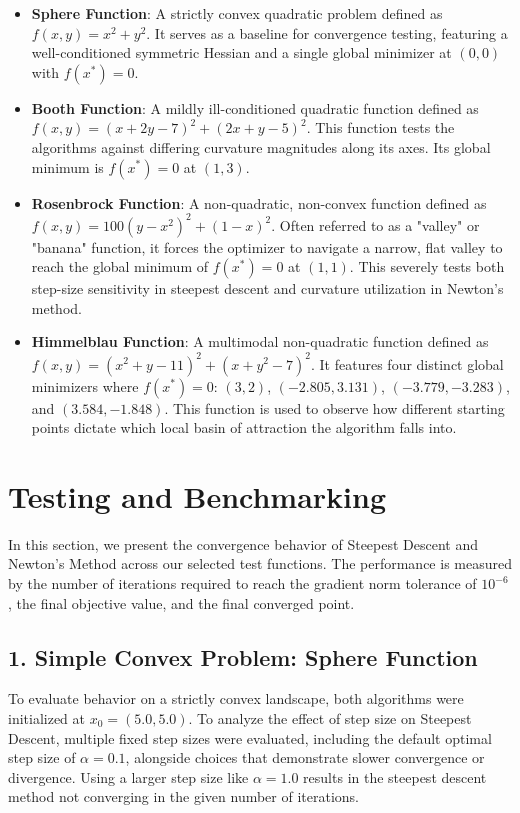 \documentclass{report}
\begin{document}
\begin{itemize}
    \item \textbf{Sphere Function}: A strictly convex quadratic problem defined as $f(x, y) = x^2 + y^2$. It serves as a baseline for convergence testing, featuring a well-conditioned symmetric Hessian and a single global minimizer at $(0, 0)$ with $f(x^*) = 0$.
    \item \textbf{Booth Function}: A mildly ill-conditioned quadratic function defined as $f(x, y) = (x + 2y - 7)^2 + (2x + y - 5)^2$. This function tests the algorithms against differing curvature magnitudes along its axes. Its global minimum is $f(x^*) = 0$ at $(1, 3)$.
    \item \textbf{Rosenbrock Function}: A non-quadratic, non-convex function defined as $f(x, y) = 100(y - x^2)^2 + (1 - x)^2$. Often referred to as a "valley" or "banana" function, it forces the optimizer to navigate a narrow, flat valley to reach the global minimum of $f(x^*) = 0$ at $(1, 1)$. This severely tests both step-size sensitivity in steepest descent and curvature utilization in Newton's method.
    \item \textbf{Himmelblau Function}: A multimodal non-quadratic function defined as $f(x, y) = (x^2 + y - 11)^2 + (x + y^2 - 7)^2$. It features four distinct global minimizers where $f(x^*) = 0$: $(3, 2)$, $(-2.805, 3.131)$, $(-3.779, -3.283)$, and $(3.584, -1.848)$. This function is used to observe how different starting points dictate which local basin of attraction the algorithm falls into.
\end{itemize}

\section*{Testing and Benchmarking}

In this section, we present the convergence behavior of Steepest Descent and Newton's Method across our selected test functions. The performance is measured by the number of iterations required to reach the gradient norm tolerance of $10^{-6}$, the final objective value, and the final converged point.

\subsection*{1. Simple Convex Problem: Sphere Function}
To evaluate behavior on a strictly convex landscape, both algorithms were initialized at $x_0 = (5.0, 5.0)$. To analyze the effect of step size on Steepest Descent, multiple fixed step sizes were evaluated, including the default optimal step size of $\alpha = 0.1$, alongside choices that demonstrate slower convergence or divergence. Using a larger step size like  $\alpha = 1.0$ results in the steepest descent method not converging in the given number of iterations.
\end{document}
